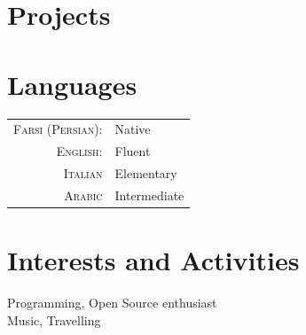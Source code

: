 \documentclass[a4paper,10pt]{article}
\begin{document}
\section{Projects}


\section{Languages}
\begin{tabular}{rl}
	\textsc{Farsi (Persian):}&Native\\
    \textsc{English:}&Fluent\\
    \textsc{Italian}& Elementary\\
    \textsc{Arabic}& Intermediate
\end{tabular}

\section{Interests and Activities}
Programming, Open Source enthusiast\\
Music, Travelling
\end{document}

